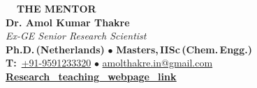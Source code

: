\documentclass[11pt,a4paper]{article}
\newcommand{\dgrad}{\ding{113}}
\newcommand{\fTitle}[1]{{\fontsize{20}{24}\selectfont\bfseries#1}}
\newcommand{\fBody}[1]{{\fontsize{15}{18}\selectfont\bfseries#1}}
\newcommand{\fSmall}[1]{{\fontsize{14}{17}\selectfont#1}}
\newcommand{\fName}[1]{{\fontsize{24}{29}\selectfont\bfseries#1}}
\begin{document}
\begin{tcolorbox}[
  enhanced,blanker,
  borderline north={1.3pt}{0pt}{brand_blue!50},
  borderline west={1.3pt}{0pt}{brand_blue!50},
  borderline east={1.3pt}{0pt}{brand_blue!50},
  borderline south={1.3pt}{0pt}{brand_blue!50},
  arc=12pt,top=8pt,bottom=8pt,left=11pt,right=11pt,
]
  \centering
  \textcolor{brand_blue}{\fTitle{\dgrad~~THE MENTOR}}\\[0.3em]
  \textcolor{deep_navy}{\fName{Dr. Amol Kumar Thakre}}\\[0.15em]
  \textcolor{deep_navy}{\fSmall{\itshape Ex-GE Senior Research Scientist}}\\[0.08em]
  \textcolor{deep_navy}{\fSmall{\bfseries Ph.D.\,(Netherlands)}}
  \quad\textcolor{deep_navy}{$\bullet$}\quad
  \textcolor{deep_navy}{\fSmall{\bfseries Masters,\,IISc\,(Chem.\,Engg.)}}\\[0.3em]
  \textcolor{deep_navy}{\fSmall{\textbf{T:}~\href{tel:+919591233320}{+91-9591233320}
    \quad\textcolor{deep_navy}{$\bullet$}\quad
    \href{mailto:amolthakre.in@gmail.com}{amolthakre.in@gmail.com}}}\\[0.12em]
  \href{https://amolthakrein-glitch.github.io/research_teaching_webpage/index.html}{%
    \textcolor{teal_accent}{\fBody{\underline{Research\_teaching\_webpage\_link}}}}
\end{tcolorbox}

\vspace{8pt}
\end{document}
